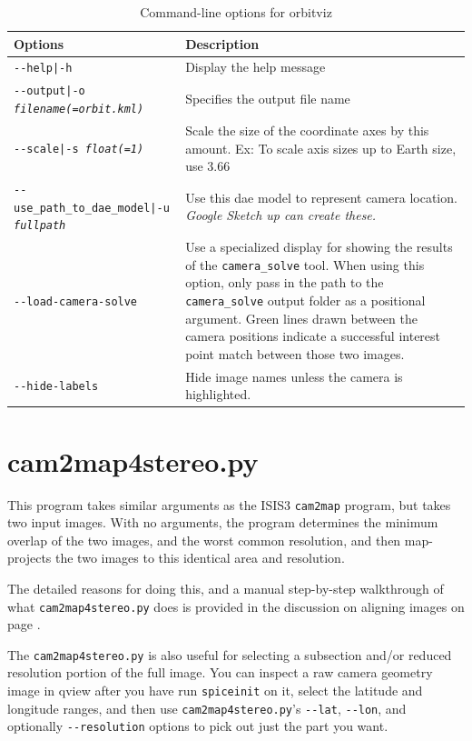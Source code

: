 \begin{longtable}{|l|p{10cm}|}
\caption{Command-line options for orbitviz}
\label{tbl:orbitviz}
\endfirsthead
\endhead
\endfoot
\endlastfoot
\hline
Options & Description \\ \hline \hline
\texttt{-\/-help|-h} & Display the help message\\ \hline
\texttt{-\/-output|-o \textit{filename(=orbit.kml)}} & Specifies the output file name \\ \hline
\texttt{-\/-scale|-s \textit{float(=1)}} & Scale the size of the coordinate axes by this amount. Ex: To scale axis sizes up to Earth size, use 3.66 \\ \hline
\texttt{-\/-use\_path\_to\_dae\_model|-u \textit{fullpath}} & Use this dae model to represent camera location. \emph{Google Sketch up can create these.} \\ \hline
\texttt{-\/-load-camera-solve} & Use a specialized display for showing the results of the \texttt{camera\_solve} tool.
When using this option, only pass in the path to the \texttt{camera\_solve} output folder as a positional argument.
Green lines drawn between the camera positions indicate a successful interest point match between those two images.\\ \hline
\texttt{-\/-hide-labels} & Hide image names unless the camera is highlighted.\\ \hline
\end{longtable}

\clearpage

\section{cam2map4stereo.py}
\label{cam2map4stereo}

This program takes similar arguments as the ISIS3 \texttt{cam2map} program,
but takes two input images.  With no arguments, the program determines
the minimum overlap of the two images, and the worst common resolution,
and then map-projects the two images to this identical area and resolution.

The detailed reasons for doing this, and a manual step-by-step walkthrough of
what \texttt{cam2map4stereo.py} does is provided in the discussion on aligning images on page \pageref{sec:AligningImages}.

The \texttt{cam2map4stereo.py} is also useful for selecting a subsection and/or reduced resolution portion of the full image.  You can inspect a raw camera geometry image in qview after you have run \texttt{spiceinit} on it, select the latitude and longitude ranges, and then use \texttt{cam2map4stereo.py}'s \texttt{-\/-lat}, \texttt{-\/-lon}, and optionally \texttt{-\/-resolution} options to pick out just the part you want.

